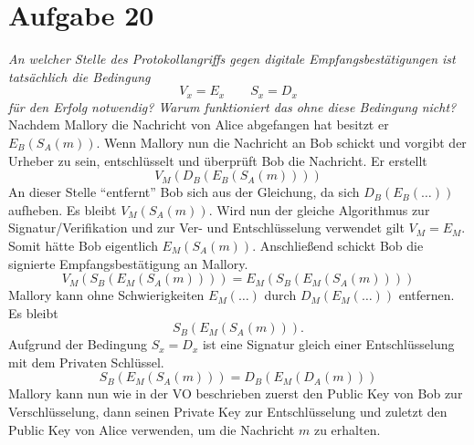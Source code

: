 \section{Aufgabe 20}
\textit{An welcher Stelle des Protokollangriffs gegen digitale Empfangsbestätigungen
ist tatsächlich die Bedingung }
\[
    V_x = E_x\qquad S_x = D_x
\]
\textit{für den Erfolg notwendig? Warum funktioniert das ohne diese Bedingung nicht?}
\vspace*{1em}\newline
Nachdem Mallory die Nachricht von Alice abgefangen hat besitzt er $E_B(S_A(m))$.
Wenn Mallory nun die Nachricht an Bob schickt und vorgibt der Urheber zu sein,
entschlüsselt und überprüft Bob die Nachricht. Er erstellt
\[
    V_M(D_B(E_B(S_A(m))))
\]
An dieser Stelle "`entfernt"' Bob sich aus der Gleichung, da sich $D_B(E_B(\dots))$
aufheben. Es bleibt $V_M(S_A(m))$. Wird nun der gleiche Algorithmus zur Signatur/Verifikation
und zur Ver- und Entschlüsselung verwendet gilt $V_M = E_M$. 
Somit hätte Bob eigentlich $E_M(S_A(m))$. Anschließend schickt Bob die 
signierte Empfangsbestätigung an Mallory.
\[
    V_M(S_B(E_M(S_A(m)))) = E_M(S_B(E_M(S_A(m))))
\]
Mallory kann ohne Schwierigkeiten $E_M(\dots)$ durch $D_M(E_M(\dots))$ entfernen.
Es bleibt 
\[
    S_B(E_M(S_A(m)))
.\]
Aufgrund der Bedingung $S_x = D_x$ ist eine Signatur gleich einer Entschlüsselung mit
dem Privaten Schlüssel.
\[
    S_B(E_M(S_A(m))) = D_B(E_M(D_A(m)))
\]
Mallory kann nun wie in der VO beschrieben zuerst den Public Key von Bob zur Verschlüsselung,
dann seinen Private Key zur Entschlüsselung und zuletzt den Public Key von Alice verwenden, um
die Nachricht $m$ zu erhalten.
